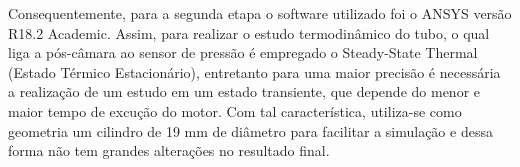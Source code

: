 Consequentemente, para a segunda etapa o software utilizado foi o ANSYS versão R18.2 Academic. Assim, para realizar o estudo termodinâmico do tubo, o qual liga a pós-câmara ao sensor de pressão é empregado o Steady-State Thermal (Estado Térmico Estacionário), entretanto para uma maior precisão é necessária a realização de um estudo em um estado transiente, que depende do menor e maior tempo de excução do motor. Com tal característica, utiliza-se como geometria um cilindro de 19 mm de diâmetro para facilitar a simulação e dessa forma não tem grandes alterações no resultado final.
